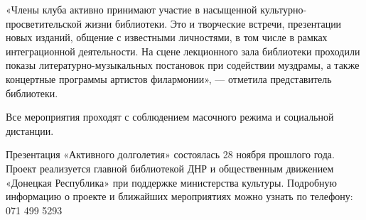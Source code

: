 «Члены клуба активно принимают участие в насыщенной культурно-просветительской
жизни библиотеки. Это и творческие встречи, презентации новых изданий, общение
с известными личностями, в том числе в рамках интеграционной деятельности. На
сцене лекционного зала библиотеки проходили показы литературно-музыкальных
постановок при содействии муздрамы, а также концертные программы артистов
филармонии», — отметила представитель библиотеки.

Все мероприятия проходят с соблюдением масочного режима и социальной дистанции.

Презентация «Активного долголетия» состоялась 28 ноября прошлого года. Проект
реализуется главной библиотекой ДНР и общественным движением «Донецкая
Республика» при поддержке министерства культуры. Подробную информацию о проекте
и ближайших мероприятиях можно узнать по телефону: 071 499 5293
